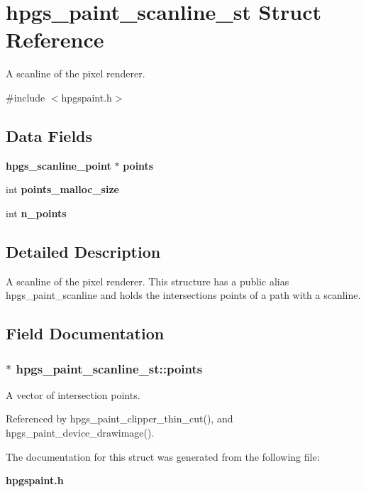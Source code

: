 \section{hpgs\_\-paint\_\-scanline\_\-st Struct Reference}
\label{structhpgs__paint__scanline__st}


A scanline of the pixel renderer.  




{\ttfamily \#include $<$hpgspaint.h$>$}

\subsection*{Data Fields}
\begin{Indent}{\bf }\par
{\em \label{_amgrpd41d8cd98f00b204e9800998ecf8427e}
 }\begin{DoxyCompactItemize}
\item 
{\bf hpgs\_\-scanline\_\-point} $\ast$ {\bf points}
\item 
int {\bfseries points\_\-malloc\_\-size}\label{structhpgs__paint__scanline__st_a19a51f9f8896740a26bb07ef277500c0}

\item 
int {\bfseries n\_\-points}\label{structhpgs__paint__scanline__st_a2e5ba769139b867a4bd641c34a91b75e}

\end{DoxyCompactItemize}
\end{Indent}


\subsection{Detailed Description}
A scanline of the pixel renderer. This structure has a public alias {\ttfamily hpgs\_\-paint\_\-scanline} and holds the intersections points of a path with a scanline. 

\subsection{Field Documentation}
\subsubsection[{points}]{$\ast$ {\bf hpgs\_\-paint\_\-scanline\_\-st::points}}\label{structhpgs__paint__scanline__st_a596e27a603eeeb05fafa0215ed518898}
A vector of intersection points. 

Referenced by hpgs\_\-paint\_\-clipper\_\-thin\_\-cut(), and hpgs\_\-paint\_\-device\_\-drawimage().



The documentation for this struct was generated from the following file:\begin{DoxyCompactItemize}
\item 
{\bf hpgspaint.h}\end{DoxyCompactItemize}
